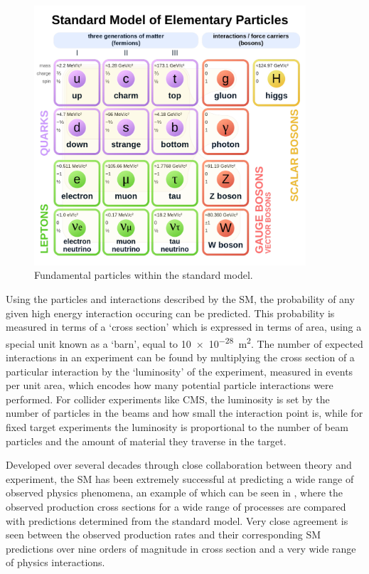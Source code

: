 \begin{figure}[htpb]
	\includegraphics[width=0.9\textwidth]{figures/smParticles.pdf}
	\centering
	\caption{Fundamental particles within the standard model.}
	\label{fig:SM}
\end{figure}

Using the particles and interactions described by the SM, the probability of any given high energy interaction occuring can be predicted.
This probability is measured in terms of a `cross section' which is expressed in terms of area, using a special unit known as a `barn', equal to \SI{10e-28}{\meter\squared}.
The number of expected interactions in an experiment can be found by multiplying the cross section of a particular interaction by the `luminosity' of the experiment, measured in events per unit area, which encodes how many potential particle interactions were performed.
For collider experiments like CMS, the luminosity is set by the number of particles in the beams and how small the interaction point is, while for fixed target experiments the luminosity is proportional to the number of beam particles and the amount of material they traverse in the target.

Developed over several decades through close collaboration between theory and experiment, the SM has been extremely successful at predicting a wide range of observed physics phenomena, an example of which can be seen in , where the observed production cross sections for a wide range of processes are compared with predictions determined from the standard model.
Very close agreement is seen between the observed production rates and their corresponding SM predictions over nine orders of magnitude in cross section and a very wide range of physics interactions.

